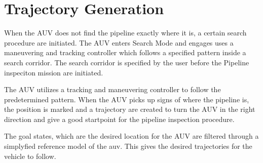 		
	
\section{Trajectory Generation}
	

	When the AUV does not find the pipeline exactly where it is, a certain search procedure are initiated.
	The AUV enters Search Mode and engages uses a maneuvering and tracking controller which follows a
	specified pattern inside a search corridor. The search corridor is specified by the user before the
	Pipeline inspeciton mission are initiated. 

	The AUV utilizes a tracking and maneuvering controller to follow the predetermined pattern. When the
	AUV picks up signs of where the pipeline is, the position is marked and a trajectory are created to
	turn the AUV in the right direction and give a good startpoint for the pipeline inspection procedure. 
	
	The goal states, which are the desired location for the AUV are filtered through a simplyfied
	reference model of the auv. This gives the desired trajectories for the vehicle to follow.


